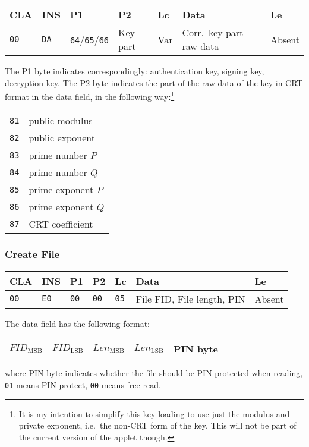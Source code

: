 \documentclass{article}
\begin{document}
\begin{flushleft}
\begin{tabular}{|l|l|l|l|l|l|l|}
\hline
CLA & INS & P1 & P2 & Lc & Data & Le \\
\hline
\texttt{00} & \texttt{DA} & \texttt{64}/\texttt{65}/\texttt{66} & Key part &
Var & Corr.\ key part raw data & Absent \\
\hline
\end{tabular}
\end{flushleft}
The P1 byte indicates correspondingly: authentication key, signing
key, decryption key.  The P2 byte indicates the part of the raw data
of the key in CRT format in the data field, in the following
way:\footnote{It is my intention to simplify this key loading to use
  just the modulus and private exponent, i.e.\ the non-CRT form of the
  key. This will not be part of the current version of the applet
  though.}
\begin{flushleft}
\begin{tabular}{|l|l|}
\hline
\texttt{81} & public modulus\\
\texttt{82} & public exponent\\
\texttt{83} & prime number $P$\\
\texttt{84} & prime number $Q$\\
\texttt{85} & prime exponent $P$\\
\texttt{86} & prime exponent $Q$\\
\texttt{87} & CRT coefficient\\
\hline
\end{tabular}
\end{flushleft}

\subsubsection{Create File}

\begin{flushleft}
\begin{tabular}{|l|l|l|l|l|l|l|}
\hline
CLA & INS & P1 & P2 & Lc & Data & Le \\
\hline
\texttt{00} & \texttt{E0} & \texttt{00}} & \texttt{00} &
\texttt{05} & File FID, File length, PIN  & Absent \\
\hline
\end{tabular}
\end{flushleft}
The data field has the following format:
\begin{flushleft}
\begin{tabular}{|l|l|l|l|l|}
\hline
$\mathit{FID}_{\mathrm{MSB}}$ & $\mathit{FID}_{\mathrm{LSB}}$ &
$\mathit{Len}_{\mathrm{MSB}}$ & $\mathit{Len}_{\mathrm{LSB}}$ &
PIN byte \\
\hline
\end{tabular}
\end{flushleft}
where PIN byte indicates whether the file should be PIN protected when
reading, \texttt{01} means PIN protect, \texttt{00} means free read.
\end{document}
